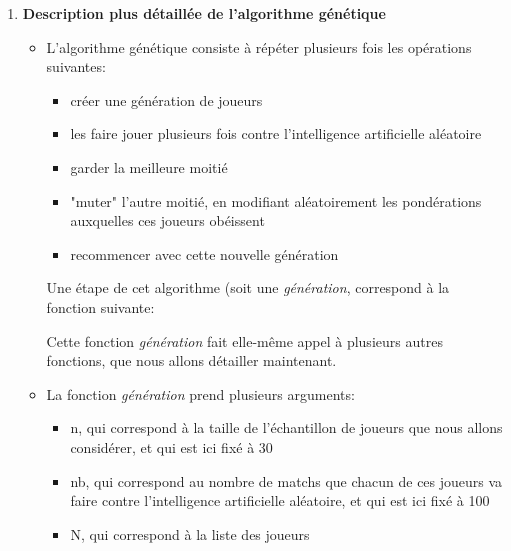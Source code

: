 \documentclass[10pt]{article}
\begin{document}
\begin{enumerate}
\begin{itemize}
\end{itemize}


\paragraph{}
\item \textbf{Description plus détaillée de l'algorithme génétique}

\begin{itemize}
    \item L'algorithme génétique consiste à répéter plusieurs fois les opérations suivantes: 
    \begin{itemize}
        \item créer une génération de joueurs
        \item les faire jouer plusieurs fois contre l'intelligence artificielle aléatoire  
        \item garder la meilleure moitié
        \item "muter" l'autre moitié, en modifiant aléatoirement les pondérations auxquelles ces joueurs obéissent 
        \item recommencer avec cette nouvelle génération
    \end{itemize}
    Une étape de cet algorithme (soit une \textit{génération}, correspond à la fonction suivante: 
    
Cette fonction \textit{génération} fait elle-même appel à plusieurs autres fonctions, que nous allons détailler maintenant. 

\item La fonction \textit{génération} prend plusieurs arguments: 
\begin{itemize}
    \item n, qui correspond à la taille de l'échantillon de joueurs que nous allons considérer, et qui est ici fixé à 30
    \item nb, qui correspond au nombre de matchs que chacun de ces joueurs va faire contre l'intelligence artificielle aléatoire, et qui est ici fixé à 100
    \item N, qui correspond à la liste des joueurs 
\end{itemize}


\end{itemize}
\end{enumerate}
\end{document}
